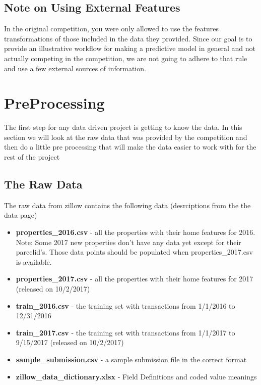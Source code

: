 \documentclass[]{book}
\theoremstyle{definition}
\theoremstyle{definition}
\theoremstyle{definition}
\theoremstyle{remark}
\begin{document}
\section{Note on Using External
Features}\label{note-on-using-external-features}

In the original competition, you were only allowed to use the features
transformations of those included in the data they provided. Since our
goal is to provide an illustrative workflow for making a predictive
model in general and not actually competing in the competition, we are
not going to adhere to that rule and use a few external sources of
information.

\chapter{PreProcessing}\label{preprocessing}

The first step for any data driven project is getting to know the data.
In this section we will look at the raw data that was provided by the
competition and then do a little pre processing that will make the data
easier to work with for the rest of the project

\section{The Raw Data}\label{the-raw-data}

The raw data from zillow contains the following data (desrciptions from
the the data page)

\begin{itemize}
\item
  \textbf{properties\_2016.csv} - all the properties with their home
  features for 2016. Note: Some 2017 new properties don't have any data
  yet except for their parcelid's. Those data points should be populated
  when properties\_2017.csv is available.
\item
  \textbf{properties\_2017.csv} - all the properties with their home
  features for 2017 (released on 10/2/2017)
\item
  \textbf{train\_2016.csv} - the training set with transactions from
  1/1/2016 to 12/31/2016
\item
  \textbf{train\_2017.csv} - the training set with transactions from
  1/1/2017 to 9/15/2017 (released on 10/2/2017)
\item
  \textbf{sample\_submission.csv} - a sample submission file in the
  correct format
\item
  \textbf{zillow\_data\_dictionary.xlsx} - Field Definitions and coded
  value meanings
\end{itemize}
\end{document}
